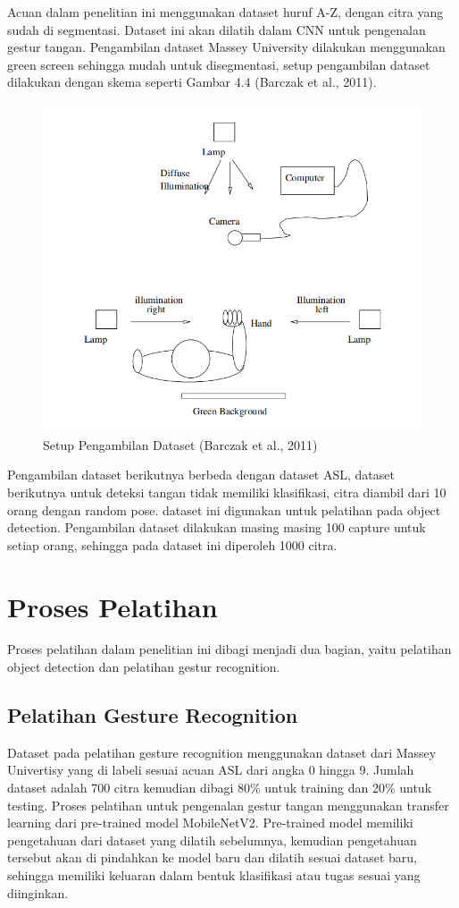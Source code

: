 Acuan dalam penelitian ini menggunakan dataset huruf A-Z, dengan citra yang sudah di segmentasi.
Dataset ini akan dilatih dalam CNN untuk pengenalan gestur tangan.
Pengambilan dataset Massey University dilakukan menggunakan green screen sehingga mudah untuk disegmentasi, setup pengambilan dataset dilakukan dengan skema seperti Gambar 4.4 (Barczak et al., 2011).
\begin{figure}[H]
	\centering
	\includegraphics[width=0.8\linewidth]{setup}
	\caption{Setup Pengambilan Dataset (Barczak et al., 2011)}
	\label{fig:setup}
\end{figure}

Pengambilan dataset berikutnya berbeda dengan dataset ASL, dataset berikutnya untuk deteksi tangan tidak memiliki klasifikasi, citra diambil dari 10 orang dengan random pose. 
dataset ini digunakan untuk pelatihan pada object detection. Pengambilan dataset dilakukan masing masing 100 capture untuk setiap orang, 
sehingga pada dataset ini diperoleh 1000 citra.
\section{Proses Pelatihan}
Proses pelatihan dalam penelitian ini dibagi menjadi dua bagian, yaitu pelatihan object detection dan pelatihan gestur recognition.
\subsection{Pelatihan Gesture Recognition}
Dataset pada pelatihan gesture recognition menggunakan dataset dari Massey Univertisy yang di labeli sesuai acuan ASL dari angka 0 hingga 9. Jumlah dataset adalah 700 citra kemudian dibagi 80\% untuk training dan 20\% untuk testing.
Proses pelatihan untuk pengenalan gestur tangan menggunakan transfer learning dari pre-trained model MobileNetV2. Pre-trained model memiliki pengetahuan dari dataset yang dilatih sebelumnya, kemudian pengetahuan tersebut akan di pindahkan ke model baru dan dilatih sesuai dataset baru, sehingga memiliki keluaran dalam bentuk klasifikasi atau tugas sesuai yang diinginkan.

